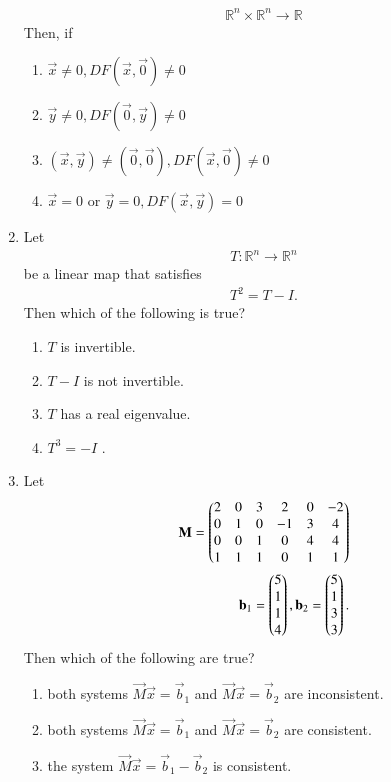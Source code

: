 \begin{enumerate}[label=\thesection.\arabic*.,ref=\thesection.\theenumi]
\begin{align}
\mathbb{R}^n \times \mathbb{R}^n \to \mathbb{R}
\end{align}
%
Then, if 
\begin{enumerate}
\item $\vec{x} \ne 0, DF(\vec{x},\vec{0}) \ne 0$ 
\item $\vec{y} \ne 0, DF(\vec{0},\vec{y}) \ne 0$ 
\item $(\vec{x},\vec{y}) \ne (\vec{0},\vec{0}), DF(\vec{x},\vec{0}) \ne 0$ 
\item $\vec{x} = 0$ or  $\vec{y} = 0, DF(\vec{x},\vec{y}) = 0$ 
\end{enumerate}  
%
\item Let
\begin{align}
T: \mathbb{R}^n \to \mathbb{R}^n
\end{align}
%
be a linear map that satisfies 
\begin{align}
T^2 = T-I.
\end{align}
Then which of the following is true?
\begin{enumerate}
\item $T$ is invertible. 
\item $T-I$ is not invertible. 
\item $T$ has a real eigenvalue. 
\item $T^3 = -I$ . 
\end{enumerate}
%
\item Let
\begin{align}
\mathbf{M} = 
\begin{pmatrix}
2 & 0 & 3 & 2 & 0 & -2
\\
0 & 1 & 0 & -1 & 3 & 4
\\
0 & 0 & 1 & 0 & 4 & 4
\\
1 & 1 & 1 & 0 & 1 & 1
\end{pmatrix}
\\
\mathbf{b}_1 = \begin{pmatrix}5 \\ 1 \\ 1 \\ 4\end{pmatrix},
\mathbf{b}_2 = \begin{pmatrix}5 \\ 1 \\ 3 \\ 3\end{pmatrix}.
\end{align}  
Then which of the following are true?
\begin{enumerate}
\item both systems $\vec{M}\vec{x} = \vec{b}_1$ and $\vec{M}\vec{x} = \vec{b}_2$ are inconsistent.
\item both systems $\vec{M}\vec{x} = \vec{b}_1$ and $\vec{M}\vec{x} = \vec{b}_2$ are consistent. 
\item the system $\vec{M}\vec{x} = \vec{b}_1-\vec{b}_2$ is consistent. 

\end{enumerate}
\end{enumerate}
